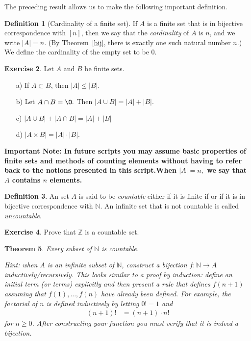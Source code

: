 \documentclass[11pt]{article}
\newcommand{\bbN}{\mathbb{N}}
\newcommand{\bbZ}{\mathbb{Z}}
\renewcommand{\emptyset}{\O}
\providecommand{\abs}[1]{\lvert #1 \rvert}
\newtheorem{theorem}{Theorem}[section]
\theoremstyle{definition}
\newtheorem{definition}[theorem]{Definition}
\newtheorem{exercise}[theorem]{Exercise}
\numberwithin{equation}{subsection}
\begin{document}
The preceding result allows us to make the following important definition.

\begin{definition}[Cardinality of a finite set]
 If $A$ is a finite set that is in bijective correspondence with $[n]$, then we say that the \emph{cardinality} of $A$ is $n$, and we write $\abs{A} = n$.  (By   Theorem~\ref{bij}, there is exactly one such natural number $n$.) We define the cardinality of the empty set to be $0.$
\end{definition}





\begin{exercise}
Let $A$ and $B$ be finite sets. 
\begin{enumerate}
\item[a)]
 If $A\subset B$, then $|A|\leq |B|$.
\item[b)]
Let  $A\cap B=\emptyset.$ Then $|A\cup B|=|A|+|B|.$ 
\item[c)] 
$|A\cup B|+|A\cap B|=|A|+|B|$
\item[d)]  
 $|A\times B|=|A|\cdot |B|$.
 \end{enumerate}
\end{exercise}




{\bf Important Note:  In future scripts you may assume basic properties of finite sets and methods of counting elements without having to refer back to the notions presented in this script.When $|A|=n,$ we say that $A$ contains $n$ elements.}

\begin{definition}
An set $A$ is said to be {\em countable} either if it is finite if or if it is in bijective correspondence with $\bbN.$ An infinite set that is not countable is called {\em uncountable}.
\end{definition}

\begin{exercise}
Prove that $\bbZ$ is a countable set.
\end{exercise}


\begin{theorem} \label{subsetbbN}
  Every subset of $\bbN$ is countable.
  
Hint: when $A$ is an infinite subset of $\bbN$,
    construct a bijection $f\colon\bbN\to A$ inductively/recursively. This looks similar to a proof by induction: define an initial term (or terms)
explicitly and then present a rule that defines $f(n+1)$ assuming that
$f(1),\ldots, f(n) $ have already been defined. For example, the factorial of $n$ is defined
inductively by letting $0! = 1$ and
\begin{align*}
  (n+1)! & = (n+1)\cdot n!
\end{align*}
for $n\geq 0$. After constructing your function you must verify that it is indeed a bijection.

\end{theorem}
\end{document}
